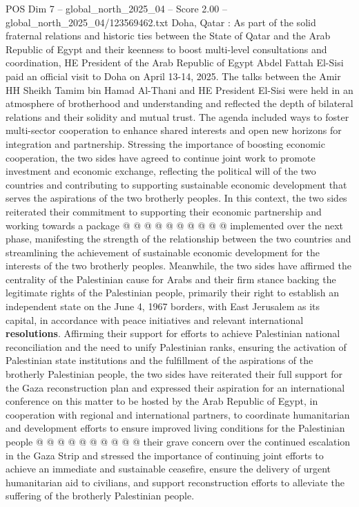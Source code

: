 \begin{textsample}{POS Dim 7 – global\_north\_2025\_04 – Score 2.00 – global\_north\_2025\_04/123569462.txt}  \label{ex:f7_pos_352}
Doha, Qatar : As part of the solid fraternal relations and historic ties between the State of Qatar and the Arab Republic of Egypt and their keenness to boost multi-level consultations and coordination, HE President of the Arab Republic of Egypt Abdel Fattah El-Sisi paid an official visit to Doha on April 13-14, 2025.
The talks between the Amir HH Sheikh Tamim bin Hamad Al-Thani and HE President El-Sisi were held in an atmosphere of brotherhood and understanding and reflected the depth of bilateral relations and their solidity and mutual trust.
The agenda included ways to foster multi-sector cooperation to enhance shared interests and open new horizons for integration and partnership.
Stressing the importance of boosting economic cooperation, the two sides have agreed to continue joint work to promote investment and economic exchange, reflecting the political will of the two countries and contributing to supporting sustainable economic development that serves the aspirations of the two brotherly peoples.
In this context, the two sides reiterated their commitment to supporting their economic partnership and working towards a package @ @ @ @ @ @ @ @ @ @ implemented over the next phase, manifesting the strength of the relationship between the two countries and streamlining the achievement of sustainable economic development for the interests of the two brotherly peoples.
Meanwhile, the two sides have affirmed the centrality of the Palestinian cause for Arabs and their firm stance backing the legitimate rights of the Palestinian people, primarily their right to establish an independent state on the June 4, 1967 borders, with East Jerusalem as its capital, in accordance with peace initiatives and relevant international \textbf{resolutions}.
Affirming their support for efforts to achieve Palestinian national reconciliation and the need to unify Palestinian ranks, ensuring the activation of Palestinian state institutions and the fulfillment of the aspirations of the brotherly Palestinian people, the two sides have reiterated their full support for the Gaza reconstruction plan and expressed their aspiration for an international conference on this matter to be hosted by the Arab Republic of Egypt, in cooperation with regional and international partners, to coordinate humanitarian and development efforts to ensure improved living conditions for the Palestinian people @ @ @ @ @ @ @ @ @ @ their grave concern over the continued escalation in the Gaza Strip and stressed the importance of continuing joint efforts to achieve an immediate and sustainable ceasefire, ensure the delivery of urgent humanitarian aid to civilians, and support reconstruction efforts to alleviate the suffering of the brotherly Palestinian people.

\end{textsample}

